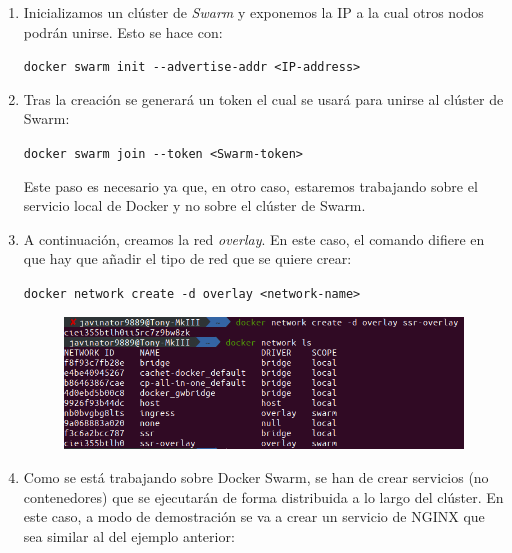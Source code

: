 \begin{enumerate}
    \item Inicializamos un clúster de \textit{Swarm} y exponemos la IP a la cual otros
          nodos podrán unirse. Esto se hace con:

          \begin{center}
              \lstinline[style=bash]!docker swarm init --advertise-addr <IP-address>!
          \end{center}

    \item Tras la creación se generará un token el cual se usará para unirse al
          clúster de Swarm:

          \begin{center}
              \lstinline[style=bash]!docker swarm join --token <Swarm-token>!
          \end{center}

          Este paso es necesario ya que, en otro caso, estaremos trabajando sobre
          el servicio local de Docker y no sobre el clúster de Swarm.

    \item A continuación, creamos la red \textit{overlay}. En este caso, el comando
          difiere en que hay que añadir el tipo de red que se quiere crear:

          \begin{center}
              \lstinline[style=bash]!docker network create -d overlay <network-name>!
          \end{center}

          \begin{figure}[H]
              \centering
              \includegraphics[width=.6\linewidth]{pictures/network-create-overlay.png}
          \end{figure}

    \item Como se está trabajando sobre Docker Swarm, se han de crear servicios
          (no contenedores) que se ejecutarán de forma distribuida a lo largo del
          clúster. En este caso, a modo de demostración se va a crear un servicio
          de NGINX que sea similar al del ejemplo anterior:


\end{enumerate}
